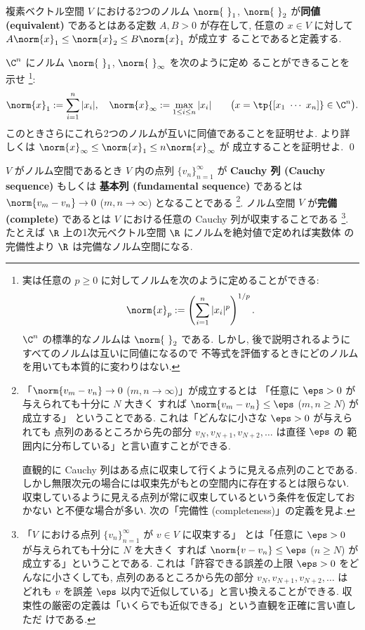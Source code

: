 \documentclass[12pt,twoside]{jarticle}
\begin{document}
複素ベクトル空間 $V$ における2つのノルム $\norm{{\ }}_1$, $\norm{{\ }}_2$ 
が{\bf 同値 (equivalent)} であるとはある定数 $A,B>0$ が存在して, 
任意の $x\in V$ に対して $A\norm{x}_1\le\norm{x}_2\le B\norm{x}_1$ が成立す
ることであると定義する.

\begin{question}[10点]
\label{q:norm-1-infty}
  $\C^n$ にノルム $\norm{{\ }}_1$, $\norm{{\ }}_\infty$ を次のように定め
  ることができることを示せ%
  \footnote{実は任意の $p\ge 0$ に対してノルムを次のように定めることができる:
    \begin{equation*}
      \norm{x}_p := \left(\sum_{i=1}^n |x_i|^p \right)^{1/p}.
    \end{equation*}
    $\C^n$ の標準的なノルムは $\norm{{\ }}_2$ である.
    しかし, 後で説明されるようにすべてのノルムは互いに同値になるので
    不等式を評価するときにどのノルムを用いても本質的に変わりはない.}:
  \begin{equation*}
    \norm{x}_1 := \sum_{i=1}^n |x_i|,
    \quad
    \norm{x}_\infty := \max_{1\le i\le n}|x_i|
    \qquad
    \bigl(x=\tp{[x_1\ \cdots\ x_n]}\in\C^n\bigr).
  \end{equation*}
  このときさらにこれら2つのノルムが互いに同値であることを証明せよ. 
  より詳しくは $\norm{x}_\infty \le \norm{x}_1 \le n\norm{x}_\infty$ が
  成立することを証明せよ.
  \qed
\end{question}


$V$ がノルム空間であるとき $V$ 内の点列 $\{v_n\}_{n=1}^\infty$ が 
{\bf Cauchy 列 (Cauchy sequence)} もしくは {\bf 基本列 (fundamental sequence)} 
であるとは $\norm{v_m-v_n}\to 0$ ($m,n\to\infty$) となることである%
\footnote{「$\norm{v_m-v_n}\to 0$ ($m,n\to\infty$)」が成立するとは
  「任意に $\eps>0$ が与えられても十分に $N$ 大きく
  すれば $\norm{v_m-v_n}\le\eps$ ($m,n\ge N$) が成立する」
  ということである.  これは「どんなに小さな $\eps>0$ が与えられても
  点列のあるところから先の部分 $v_N,v_{N+1},v_{N+2},\ldots$ は直径 $\eps$ の
  範囲内に分布している」と言い直すことができる.

  直観的に Cauchy 列はある点に収束して行くように見える点列のことである.
  しかし無限次元の場合には収束先がもとの空間内に存在するとは限らない.
  収束しているように見える点列が常に収束しているという条件を仮定しておかない
  と不便な場合が多い. 次の「完備性 (completeness)」の定義を見よ.}.
ノルム空間 $V$ が{\bf 完備 (complete)} であるとは $V$ における任意の Cauchy 
列が収束することである%
\footnote{「$V$ における点列 $\{v_n\}_{n=1}^\infty$ が $v\in V$ に収束する」
  とは「任意に $\eps>0$ が与えられても十分に $N$ を大きく
  すれば $\norm{v-v_n}\le\eps$ ($n\ge N$) が成立する」ということである.
  これは「許容できる誤差の上限 $\eps>0$ をどんなに小さくしても, 
  点列のあるところから先の部分 $v_N,v_{N+1},v_{N+2},\ldots$ は
  どれも $v$ を誤差 $\eps$ 以内で近似している」と言い換えることができる.
  収束性の厳密の定義は「いくらでも近似できる」という直観を正確に言い直しただ
  けである.}.
たとえば $\R$ 上の1次元ベクトル空間 $\R$ にノルムを絶対値で定めれば実数体
の完備性より $\R$ は完備なノルム空間になる.
\end{document}
